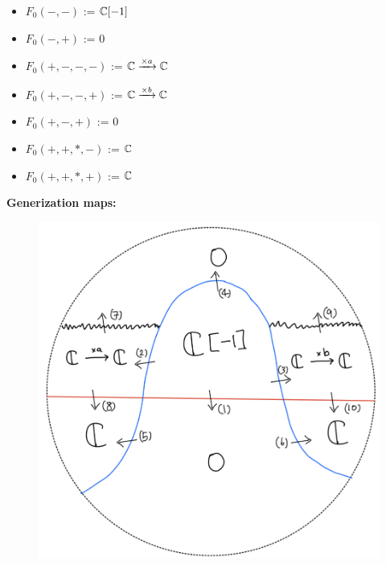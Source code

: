 \begin{itemize}
\item $F_0(-,-)$ := $\mathbb{C}[-1]$
\item $F_0(-,+)$ := $0$
\item $F_0(+,-,-,-)$ := $\mathbb{C} \xrightarrow{\times a} \mathbb{C} $
\item $F_0(+,-,-,+)$ := $\mathbb{C} \xrightarrow{\times b} \mathbb{C} $
\item $F_0(+,-,+)$ := $0$
\item $F_0(+,+,*,-)$ := $\mathbb{C}$
\item $F_0(+,+,*,+)$ := $\mathbb{C}$
\end{itemize}

\textbf{Generization maps:}
\begin{figure}[H]
    \centering
    \includegraphics[scale = 0.95]{diagrams/lemma2/29.png} 
    \caption{}
    \label{fig:your-label}
\end{figure}
